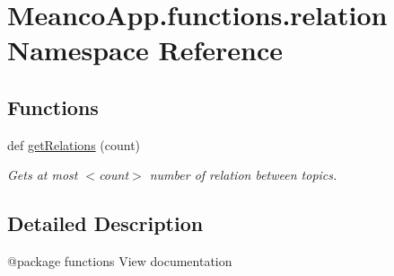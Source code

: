 \hypertarget{namespace_meanco_app_1_1functions_1_1relation}{}\section{Meanco\+App.\+functions.\+relation Namespace Reference}
\label{namespace_meanco_app_1_1functions_1_1relation}
\subsection*{Functions}
\begin{DoxyCompactItemize}
\item 
\hypertarget{namespace_meanco_app_1_1functions_1_1relation_a7d888859517c743e36af3899efd75dbb}{}\label{namespace_meanco_app_1_1functions_1_1relation_a7d888859517c743e36af3899efd75dbb} 
def \hyperlink{namespace_meanco_app_1_1functions_1_1relation_a7d888859517c743e36af3899efd75dbb}{get\+Relations} (count)
\begin{DoxyCompactList}\small\item\em Gets at most $<$count$>$ number of relation between topics. \end{DoxyCompactList}\end{DoxyCompactItemize}


\subsection{Detailed Description}
\begin{DoxyVerb}@package functions
View documentation\end{DoxyVerb}
 
